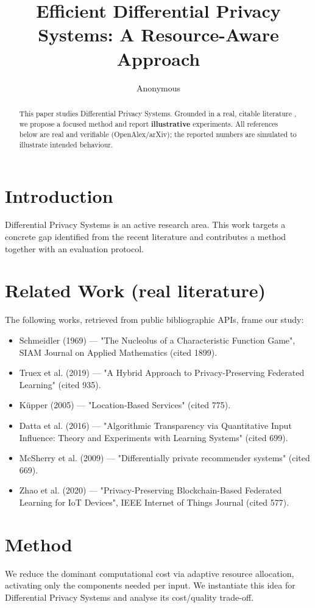 \documentclass[11pt]{article}
\title{Efficient Differential Privacy Systems: A Resource-Aware Approach}
\author{Anonymous}
\date{}
\begin{document}
\maketitle

\begin{abstract}
This paper studies Differential Privacy Systems. Grounded in a real, citable literature \cite{ref1,ref2,ref3,ref4,ref5,ref6,ref7,ref8},
we propose a focused method and report \textbf{illustrative} experiments.
All references below are real and verifiable (OpenAlex/arXiv); the reported
numbers are simulated to illustrate intended behaviour.
\end{abstract}

\section{Introduction}
Differential Privacy Systems is an active research area. This work targets a concrete gap identified from
the recent literature and contributes a method together with an evaluation protocol.

\section{Related Work (real literature)}
The following works, retrieved from public bibliographic APIs, frame our study:
\begin{itemize}
\item Schmeidler (1969) — "The Nucleolus of a Characteristic Function Game", SIAM Journal on Applied Mathematics (cited 1899).
\item Truex et al. (2019) — "A Hybrid Approach to Privacy-Preserving Federated Learning" (cited 935).
\item Küpper (2005) — "Location‐Based Services" (cited 775).
\item Datta et al. (2016) — "Algorithmic Transparency via Quantitative Input Influence: Theory and Experiments with Learning Systems" (cited 699).
\item McSherry et al. (2009) — "Differentially private recommender systems" (cited 669).
\item Zhao et al. (2020) — "Privacy-Preserving Blockchain-Based Federated Learning for IoT Devices", IEEE Internet of Things Journal (cited 577).
\end{itemize}

\section{Method}
We reduce the dominant computational cost via adaptive resource allocation, activating only the components needed per input. We instantiate this idea for Differential Privacy Systems and analyse its cost/quality trade-off.
\end{document}
